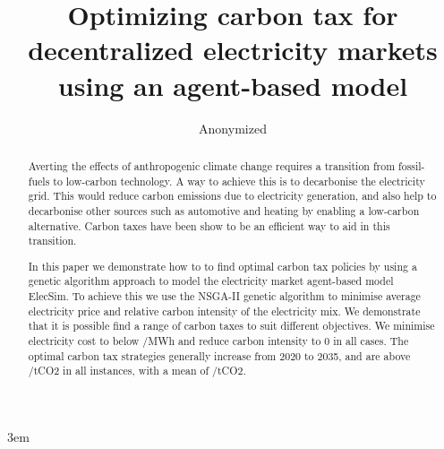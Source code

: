 \documentclass[sigconf]{acmart}
\begin{document}
\emergencystretch 3em

\title[Optimizing carbon tax with optimization]{Optimizing carbon tax for decentralized electricity markets using an agent-based model}

%
%
\author{Anonymized}
\renewcommand{\shortauthors}{Anonymized}




\begin{abstract}
 

Averting the effects of anthropogenic climate change requires a transition from fossil-fuels to low-carbon technology. A way to achieve this is to decarbonise the electricity grid. This would reduce carbon emissions due to electricity generation, and also help to decarbonise other sources such as automotive and heating by enabling a low-carbon alternative. Carbon taxes have been show to be an efficient way to aid in this transition.

In this paper we demonstrate how to to find optimal carbon tax policies by using a genetic algorithm approach to model the electricity market agent-based model ElecSim. To achieve this we use the NSGA-II genetic algorithm to minimise average electricity price and relative carbon intensity of the electricity mix. We demonstrate that it is possible find a range of carbon taxes to suit different objectives. We minimise electricity cost to below /MWh and reduce carbon intensity to 0 in all cases. The optimal carbon tax strategies generally increase from 2020 to 2035, and are above /tCO2 in all instances, with a mean of /tCO2.


\end{abstract}
\end{document}
